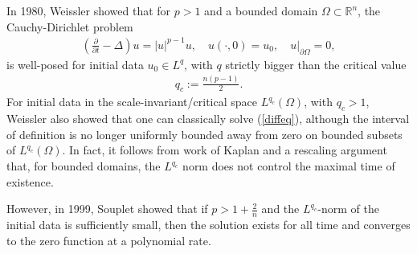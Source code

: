 \documentclass[12pt]{amsart}
\newcommand{\p}{{ \partial}}
\renewcommand{\1}{{\mathbf 1}}
\newcommand{\R}{{\mathbb R}}
\renewcommand{\p}{{\partial}}
\theoremstyle{others}
\numberwithin{equation}{section}
\begin{document}
 In 1980, Weissler \cite{weisslersemilinearLpwellposed} showed that for \(p > 1\) and a bounded domain \(\Omega \subset \R^n\), the Cauchy-Dirichlet problem
 \begin{align}\label{diffeq}
     \left( \frac{\p}{\partial t} - \Delta \right) u = |u|^{p-1}u, \quad u(\cdot, 0) = u_0, \quad u\big|_{\partial \Omega} = 0,
\end{align}
is well-posed for initial data \(u_0 \in L^q\), with \(q\) strictly bigger than the critical value
 \begin{align*}
     q_c := \frac{n(p-1)}{2}.
 \end{align*} For initial data in the scale-invariant/critical space \(L^{q_c}(\Omega)\), with \(q_c > 1\), Weissler also showed that one can classically solve (\ref{diffeq}), although the interval of definition is no longer uniformly bounded away from zero on bounded subsets of \(L^{q_c}(\Omega)\). In fact, it follows from work of Kaplan \cite{kaplan} and a rescaling argument \cite[Remark 15.4 (i) and Theorem 17.1]{superlinearbook} that, for bounded domains, the \(L^{q_c}\) norm does not control the maximal time of existence. \par
 However, in 1999, Souplet \cite{soupletstability} showed that if \(p > 1 + \frac{2}{n}\) 
 and the \(L^{q_c}\)-norm of the initial data is sufficiently small, then the solution exists for all time and converges to the zero function at a polynomial rate. \par
 
\end{document}
